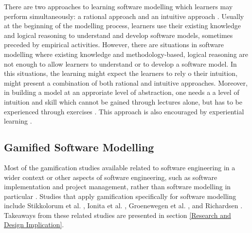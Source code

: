 \documentclass[12pt, a4paper]{report}
\begin{document}
{There are two approaches to learning software modelling which learners may perform simultaneously: a rational approach and an intuitive approach \cite{bobkowska2014software}. Usually at the beginning of the modelling process, learners use their existing knowledge and logical reasoning to understand and develop software models, sometimes preceded by empirical activities. However, there are situations in software modelling where existing knowledge and methodology-based, logical reasoning are not enough to allow learners to understand or to develop a software model. In this situations, the learning might expect the learners to rely o their intuition, might present a combination of both rational and intuitive approaches. Moreover, in building a model at an approriate level of abstraction, one needs a a level of intuition and skill which cannot be gained through lectures alone, but has to be experienced through exercises \cite{engels2005teaching}. This approach is also encouraged by experiential learning \cite{kolb2014experiential}.   

\subsection{Gamified Software Modelling}
\label{Gamified Software Modelling}
Most of the gamification studies available related to software engineering in a wider context or other aspects of software engineering, such as software implementation and project management, rather than software modelling in particular \cite{Pedreira2015}. Studies that apply gamification specifically for software modelling include Stikkolorum et al. \cite{Stikkolorum2014}, Ionita et al. \cite{Ionita2015}, Groenewegen et al. \cite{Groenewegen2010}, and Richardsen \cite{Richardsen2014}. Takeaways from these related studies are presented in section \ref{Research and Design Implication}.

}
\end{document}
